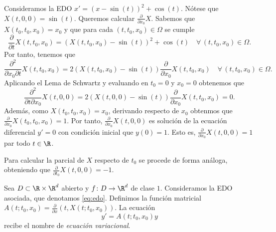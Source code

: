 \begin{ex}
  Consideramos la EDO $x' = (x - \sin(t))^2 + \cos(t)$. Nótese que $X(t, 0, 0) = \sin(t)$. Queremos
  calcular $\frac{\partial}{\partial x_0} X$.  Sabemos que $X(t_0, t_0, x_0) = x_0$ y que para cada
  $(t, t_0, x_0) \in \Omega$ se cumple
  \[ \frac{\partial}{\partial t} X(t, t_0, x_0) = (X(t, t_0, x_0) - \sin(t))^2 + \cos(t) \quad
    \forall \, (t, t_0, x_0) \in \Omega. \]
  Por tanto, tenemos que
  \[ \frac{\partial^2}{\partial x_0\partial t} X(t, t_0, x_0) = 2(X(t, t_0, x_0) -
    \sin(t))\frac{\partial}{\partial x_0} X(t, t_0, x_0) \quad \forall \, (t, t_0, x_0) \in
    \Omega. \]
  Aplicando el Lema de Schwartz y evaluando en $t_0 = 0$ y $x_0 = 0$ obtenemos que
  \[ \frac{\partial^2}{\partial t\partial x_0} X(t, 0, 0) = 2(X(t, 0, 0) -
    \sin(t))\frac{\partial}{\partial x_0} X(t, t_0, x_0) = 0. \]
  Además, como $X(t_0,t_0, x_0) = x_0$, derivando respecto de $x_0$ obtenmos que
  $\frac{\partial}{\partial x_0} X(t_0, t_0, x_0) = 1$. Por tanto,
  $\frac{\partial}{\partial x_0}X(t, 0,0)$ es solución de la ecuación diferencial $y' = 0$ con
  condición inicial que $y(0) = 1$. Esto es, $\frac{\partial}{\partial x_0}X(t, 0,0) = 1$ par todo
  $t \in \R$.

  Para calcular la parcial de $X$ respecto de $t_0$ se procede de forma análoga, obteniendo que
  $\frac{\partial}{\partial t_0} X(t, 0,0) = -1$.
\end{ex}

\begin{definition}
  Sea $D \subset \R \times \R^d$ abierto y $f \colon D \to \R^d$ de clase $1$. Consideramos la EDO
  asociada, que denotamos \eqref{eq:edo}. Definimos la función matricial
  $A(t;t_0, x_0) = \frac{\partial}{\partial x} (t, X(t;t_0,x_0))$. La ecuación
  \begin{equation}
    \label{eq:variacional}
    y' = A(t; t_0, x_0) y
  \end{equation}
  recibe el nombre de \emph{ecuación variacional}.
\end{definition}

